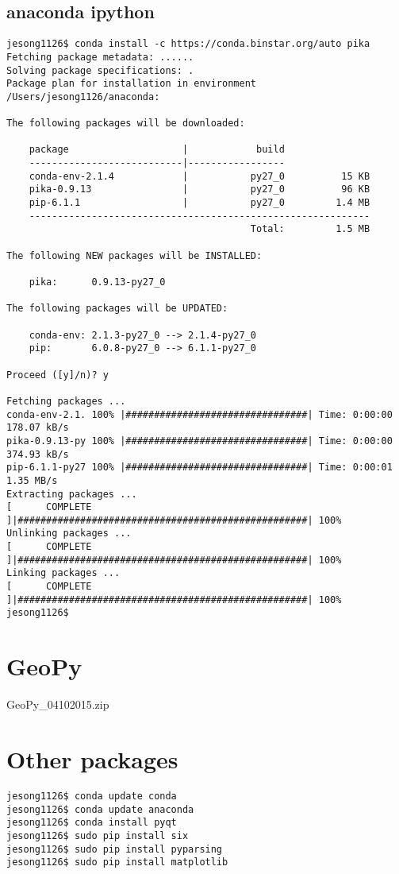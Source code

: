 \documentclass[10pt]{article}
\begin{document}
\subsection{anaconda ipython}  
\begin{verbatim} 
jesong1126$ conda install -c https://conda.binstar.org/auto pika
Fetching package metadata: ......
Solving package specifications: .
Package plan for installation in environment /Users/jesong1126/anaconda:

The following packages will be downloaded:

    package                    |            build
    ---------------------------|-----------------
    conda-env-2.1.4            |           py27_0          15 KB
    pika-0.9.13                |           py27_0          96 KB
    pip-6.1.1                  |           py27_0         1.4 MB
    ------------------------------------------------------------
                                           Total:         1.5 MB

The following NEW packages will be INSTALLED:

    pika:      0.9.13-py27_0

The following packages will be UPDATED:

    conda-env: 2.1.3-py27_0 --> 2.1.4-py27_0 
    pip:       6.0.8-py27_0 --> 6.1.1-py27_0 

Proceed ([y]/n)? y

Fetching packages ...
conda-env-2.1. 100% |################################| Time: 0:00:00 178.07 kB/s
pika-0.9.13-py 100% |################################| Time: 0:00:00 374.93 kB/s
pip-6.1.1-py27 100% |################################| Time: 0:00:01   1.35 MB/s
Extracting packages ...
[      COMPLETE      ]|###################################################| 100%
Unlinking packages ...
[      COMPLETE      ]|###################################################| 100%
Linking packages ...
[      COMPLETE      ]|###################################################| 100%
jesong1126$ 
\end{verbatim}

\section{GeoPy}
GeoPy\_04102015.zip


\section{Other packages} \label{sec:matplotlib} 
\begin{verbatim} 
jesong1126$ conda update conda
jesong1126$ conda update anaconda
jesong1126$ conda install pyqt 
jesong1126$ sudo pip install six
jesong1126$ sudo pip install pyparsing
jesong1126$ sudo pip install matplotlib
\end{verbatim}





%
%
%
\end{document}
